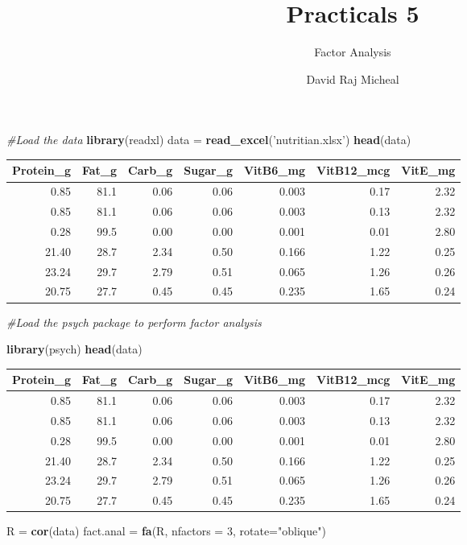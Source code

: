\documentclass[]{article}
\title{Practicals 5}
\subtitle{Factor Analysis}
\author{David Raj Micheal}
\date{}
\newenvironment{Shaded}{\begin{snugshade}}{\end{snugshade}}
\newcommand{\KeywordTok}[1]{\textcolor[rgb]{0.13,0.29,0.53}{\textbf{#1}}}
\newcommand{\DataTypeTok}[1]{\textcolor[rgb]{0.13,0.29,0.53}{#1}}
\newcommand{\DecValTok}[1]{\textcolor[rgb]{0.00,0.00,0.81}{#1}}
\newcommand{\StringTok}[1]{\textcolor[rgb]{0.31,0.60,0.02}{#1}}
\newcommand{\CommentTok}[1]{\textcolor[rgb]{0.56,0.35,0.01}{\textit{#1}}}
\newcommand{\NormalTok}[1]{#1}
\begin{document}
\maketitle

\begin{Shaded}
\begin{Highlighting}[]
\CommentTok{#Load the data }
\KeywordTok{library}\NormalTok{(readxl)}
\NormalTok{data =}\StringTok{ }\KeywordTok{read_excel}\NormalTok{(}\StringTok{'nutritian.xlsx'}\NormalTok{)}
\KeywordTok{head}\NormalTok{(data)}
\end{Highlighting}
\end{Shaded}

\begin{longtable}[]{@{}rrrrrrr@{}}
\toprule
Protein\_g & Fat\_g & Carb\_g & Sugar\_g & VitB6\_mg & VitB12\_mcg &
VitE\_mg\tabularnewline
\midrule
\endhead
0.85 & 81.1 & 0.06 & 0.06 & 0.003 & 0.17 & 2.32\tabularnewline
0.85 & 81.1 & 0.06 & 0.06 & 0.003 & 0.13 & 2.32\tabularnewline
0.28 & 99.5 & 0.00 & 0.00 & 0.001 & 0.01 & 2.80\tabularnewline
21.40 & 28.7 & 2.34 & 0.50 & 0.166 & 1.22 & 0.25\tabularnewline
23.24 & 29.7 & 2.79 & 0.51 & 0.065 & 1.26 & 0.26\tabularnewline
20.75 & 27.7 & 0.45 & 0.45 & 0.235 & 1.65 & 0.24\tabularnewline
\bottomrule
\end{longtable}

\begin{Shaded}
\begin{Highlighting}[]
\CommentTok{#Load the psych package to perform factor analysis}

\KeywordTok{library}\NormalTok{(psych)}
\KeywordTok{head}\NormalTok{(data)}
\end{Highlighting}
\end{Shaded}

\begin{longtable}[]{@{}rrrrrrr@{}}
\toprule
Protein\_g & Fat\_g & Carb\_g & Sugar\_g & VitB6\_mg & VitB12\_mcg &
VitE\_mg\tabularnewline
\midrule
\endhead
0.85 & 81.1 & 0.06 & 0.06 & 0.003 & 0.17 & 2.32\tabularnewline
0.85 & 81.1 & 0.06 & 0.06 & 0.003 & 0.13 & 2.32\tabularnewline
0.28 & 99.5 & 0.00 & 0.00 & 0.001 & 0.01 & 2.80\tabularnewline
21.40 & 28.7 & 2.34 & 0.50 & 0.166 & 1.22 & 0.25\tabularnewline
23.24 & 29.7 & 2.79 & 0.51 & 0.065 & 1.26 & 0.26\tabularnewline
20.75 & 27.7 & 0.45 & 0.45 & 0.235 & 1.65 & 0.24\tabularnewline
\bottomrule
\end{longtable}

\begin{Shaded}
\begin{Highlighting}[]
\NormalTok{R =}\StringTok{ }\KeywordTok{cor}\NormalTok{(data)}
\NormalTok{fact.anal =}\StringTok{ }\KeywordTok{fa}\NormalTok{(R, }\DataTypeTok{nfactors =} \DecValTok{3}\NormalTok{, }\DataTypeTok{rotate=}\StringTok{"oblique"}\NormalTok{)}
\end{Highlighting}
\end{Shaded}
\end{document}
